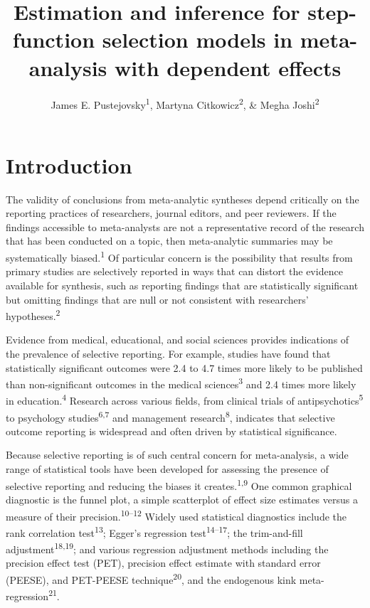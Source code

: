 \documentclass[
  american,
  man, donotrepeattitle,floatsintext]{apa7}
\title{Estimation and inference for step-function selection models in meta-analysis with dependent effects}
\author{James E. Pustejovsky\textsuperscript{1}, Martyna Citkowicz\textsuperscript{2}, \& Megha Joshi\textsuperscript{2}}
\date{}
\affiliation{\vspace{0.5cm}\textsuperscript{1} University of Wisconsin-Madison\\\textsuperscript{2} American Institutes for Research}
\begin{document}
\maketitle

\section{Introduction}\label{introduction}

The validity of conclusions from meta-analytic syntheses depend critically on the reporting practices of researchers, journal editors, and peer reviewers.
If the findings accessible to meta-analysts are not a representative record of the research that has been conducted on a topic, then meta-analytic summaries may be systematically biased.\textsuperscript{1}
Of particular concern is the possibility that results from primary studies are selectively reported in ways that can distort the evidence available for synthesis, such as reporting findings that are statistically significant but omitting findings that are null or not consistent with researchers' hypotheses.\textsuperscript{2}

Evidence from medical, educational, and social sciences provides indications of the prevalence of selective reporting. For example, studies have found that statistically significant outcomes were 2.4 to 4.7 times more likely to be published than non-significant outcomes in the medical sciences\textsuperscript{3} and 2.4 times more likely in education.\textsuperscript{4} Research across various fields, from clinical trials of antipsychotics\textsuperscript{5} to psychology studies\textsuperscript{6,7} and management research\textsuperscript{8}, indicates that selective outcome reporting is widespread and often driven by statistical significance.

Because selective reporting is of such central concern for meta-analysis, a wide range of statistical tools have been developed for assessing the presence of selective reporting and reducing the biases it creates.\textsuperscript{1,9}
One common graphical diagnostic is the funnel plot, a simple scatterplot of effect size estimates versus a measure of their precision.\textsuperscript{10--12} Widely used statistical diagnostics include the rank correlation test\textsuperscript{13}; Egger's regression test\textsuperscript{14--17}; the trim-and-fill adjustment\textsuperscript{18,19}; and various regression adjustment methods including the precision effect test (PET), precision effect estimate with standard error (PEESE), and PET-PEESE technique\textsuperscript{20}, and the endogenous kink meta-regression\textsuperscript{21}.
\end{document}
